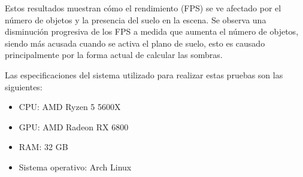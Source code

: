 Estos resultados muestran cómo el rendimiento (FPS) se ve afectado por el número
de objetos y la presencia del suelo en la escena. Se observa una disminución
progresiva de los FPS a medida que aumenta el número de objetos, siendo más
acusada cuando se activa el plano de suelo, esto es causado principalmente por la forma actual de calcular las sombras.

Las especificaciones del sistema utilizado para realizar estas pruebas son las siguientes:

\begin{itemize}
    \item CPU: AMD Ryzen 5 5600X
    \item GPU: AMD Radeon RX 6800
    \item RAM: 32 GB
    \item Sistema operativo: Arch Linux
\end{itemize}
